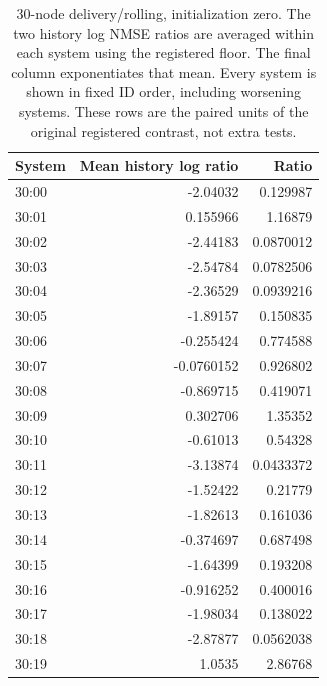 \begin{table}[ht]
\centering\scriptsize
\begin{tabular}{lrr}
\toprule
System & Mean history log ratio & Ratio\\
\midrule
30:00 & -2.04032 & 0.129987\\
30:01 & 0.155966 & 1.16879\\
30:02 & -2.44183 & 0.0870012\\
30:03 & -2.54784 & 0.0782506\\
30:04 & -2.36529 & 0.0939216\\
30:05 & -1.89157 & 0.150835\\
30:06 & -0.255424 & 0.774588\\
30:07 & -0.0760152 & 0.926802\\
30:08 & -0.869715 & 0.419071\\
30:09 & 0.302706 & 1.35352\\
30:10 & -0.61013 & 0.54328\\
30:11 & -3.13874 & 0.0433372\\
30:12 & -1.52422 & 0.21779\\
30:13 & -1.82613 & 0.161036\\
30:14 & -0.374697 & 0.687498\\
30:15 & -1.64399 & 0.193208\\
30:16 & -0.916252 & 0.400016\\
30:17 & -1.98034 & 0.138022\\
30:18 & -2.87877 & 0.0562038\\
30:19 & 1.0535 & 2.86768\\
\bottomrule
\end{tabular}
\caption{30-node delivery/rolling, initialization zero. The two history log NMSE ratios are averaged within each system using the registered floor. The final column exponentiates that mean. Every system is shown in fixed ID order, including worsening systems. These rows are the paired units of the original registered contrast, not extra tests.}
\end{table}
